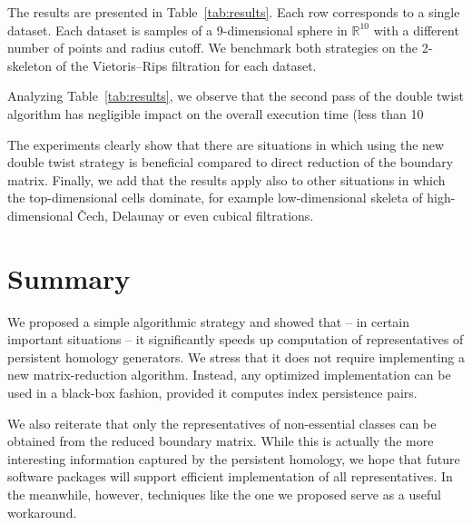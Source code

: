 The results are presented in Table~\ref{tab:results}. Each row corresponds to a single dataset. Each dataset is samples of a 9-dimensional sphere in $\mathbb{R}^{10}$ with a different number of points and radius cutoff. We benchmark both strategies on the 2-skeleton of the Vietoris--Rips filtration for each dataset.

 Analyzing Table~\ref{tab:results}, we observe that the second pass of the double twist algorithm has negligible impact on the overall execution time (less than 10\

The experiments clearly show that there are situations in which using the new double twist strategy is beneficial compared to direct reduction of the boundary matrix. Finally, we add that the results apply also to other situations in which the top-dimensional cells dominate, for example low-dimensional skeleta of high-dimensional \v{C}ech, Delaunay or even cubical filtrations.

\section{Summary}
\label{sec:summary}
We proposed a simple algorithmic strategy and showed that -- in certain important situations -- it significantly speeds up computation of representatives of persistent homology generators. We stress that it does not require implementing a new matrix-reduction algorithm. Instead, any optimized implementation can be used in a black-box fashion, provided it computes index persistence pairs.

We also reiterate that only the representatives of non-essential classes can be obtained from the reduced boundary matrix. While this is actually the more interesting information captured by the persistent homology, we hope that future software packages will support efficient implementation of all representatives. In the meanwhile, however, techniques like the one we proposed serve as a useful workaround.





